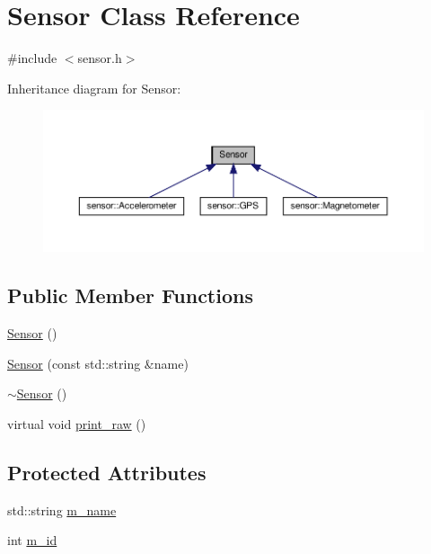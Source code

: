 \hypertarget{class_sensor}{}\section{Sensor Class Reference}
\label{class_sensor}


{\ttfamily \#include $<$sensor.\+h$>$}



Inheritance diagram for Sensor\+:\nopagebreak
\begin{figure}[H]
\begin{center}
\leavevmode
\includegraphics[width=350pt]{class_sensor__inherit__graph}
\end{center}
\end{figure}
\subsection*{Public Member Functions}
\begin{DoxyCompactItemize}
\item 
\hyperlink{class_sensor_a342d6d11ef572c8cba92cb76fb1a294b}{Sensor} ()
\item 
\hyperlink{class_sensor_aa84aad87186b00eb99dd93033bc0cb30}{Sensor} (const std\+::string \&name)
\item 
\hyperlink{class_sensor_aee8c70e7ef05ce65e7ee33686b5d7db2}{$\sim$\+Sensor} ()
\item 
virtual void \hyperlink{class_sensor_a6f16371eb71419f49ea1363ca81d0755}{print\+\_\+raw} ()
\end{DoxyCompactItemize}
\subsection*{Protected Attributes}
\begin{DoxyCompactItemize}
\item 
std\+::string \hyperlink{class_sensor_a364a2c3d5e77d1af61f2532a130c2836}{m\+\_\+name}
\item 
int \hyperlink{class_sensor_a3d1ebe0e05e5d75604330a70d3acf9e5}{m\+\_\+id}
\end{DoxyCompactItemize}
